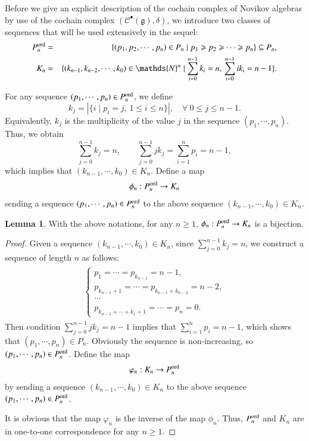\documentclass[12pt]{amsart}
\theoremstyle{definition}
\newtheorem{lem}[thm]{Lemma}
\newcommand{\g}{\mathfrak g}
\newcommand{\dsN}{\mathds{N}}
\newcommand{\ord}{{\rm ord}}
\newcommand{\scrC}{{\mathscr{C}}}
\begin{document}
Before we give an explicit description of the cochain complex of Novikov algebras by use of the cochain complex $(\scrC^\bullet(\g),\delta)$, we introduce two classes of sequences that will be used extensively in the sequel:
\begin{eqnarray}
P^{\ord}_n&=&\{(p_1,p_2,\cdots,p_n)\in P_n\mid p_1\geqslant p_2\geqslant\cdots \geqslant p_n\}\subseteq P_n,\label{P-n-ord}\\
K_n&=&\{(k_{n-1},k_{n-2},\cdots,k_0)\in\dsN^n\mid\sum_{i=0}^{n-1}k_i=n,\,\sum_{i=0}^{n-1}ik_i=n-1\}.\label{K-n}
\end{eqnarray}

For any sequence $(p_1,\cdots,p_n)\in P^{\ord}_n$, we define
\[
k_j = |\{i\mid p_i = j,\,1\leq i\leq n\}|,\quad\forall~0\leq j\leq n-1.
\]
Equivalently, $k_j$ is the multiplicity of the value $j$ in the sequence $(p_1,\cdots,p_n)$. Thus, we obtain
$$\sum_{j=0}^{n-1} k_j = n,\qquad\sum_{j=0}^{n-1} j k_j =\sum_{i=1}^n p_i = n-1,$$
which implies that $(k_{n-1},\cdots,k_0)\in K_n$. Define a map
\begin{equation}\label{phi-n}
	\phi_n:P^{\ord}_n\to K_n
\end{equation}
sending a sequence $(p_1,\cdots,p_n)\in P^{\ord}_n$ to the above sequence $(k_{n-1},\cdots,k_0)\in K_n$.


\begin{lem}\label{P-K}
With the above notations, for any $n\geq 1$,   $\phi_n:P^{\ord}_n \to K_n$ is a bijection.
\end{lem}

\begin{proof}
Given a sequence $(k_{n-1},\cdots,k_0)\in K_n$, since $\sum\limits_{j=0}^{n-1} k_j = n$, we construct a sequence of length $n$ as follows:
\begin{align}\label{map-Kn-to-Pn-ord}
\begin{split}
\left \{
\begin{array}{l}
p_1=\cdots=p_{k_{n-1}}=n-1,\\
p_{k_{n-1}+1}=\cdots=p_{k_{n-1}+k_{n-2}}=n-2,\\
\cdots\\
p_{k_{n-1}+\cdots+k_1+1}=\cdots=p_n=0.
\end{array}
\right.
\end{split}
\end{align}
Then condition $\sum\limits_{j=0}^{n-1} j k_j = n-1$ implies that $\sum\limits_{i=1}^n p_i = n-1$, which shows that $(p_1,\cdots,p_n)\in P_n$. Obviously the  sequence  is non-increasing, so $(p_1,\cdots,p_n)\in P^\ord_n$. Define the map
$$\varphi_n:K_n\to P^{\ord}_n$$
by sending a sequence $(k_{n-1},\cdots,k_0)\in K_n$ to the above sequence $(p_1,\cdots,p_n)\in P^{\ord}_n$.

It is obvious that the map $\varphi_n$ is the inverse of the map $\phi_n$.  Thus, $P^\ord_n$ and $K_n$ are in one-to-one correspondence for any $n\geq 1$.
\end{proof}
\end{document}
